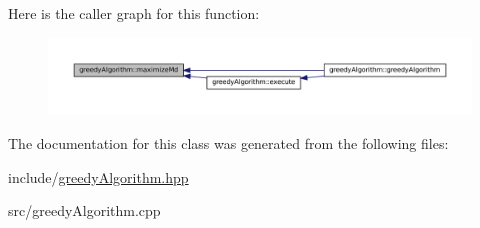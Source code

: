 Here is the caller graph for this function\+:
\nopagebreak
\begin{figure}[H]
\begin{center}
\leavevmode
\includegraphics[width=350pt]{classgreedyAlgorithm_a4968e1371d2fdfb1b1b6f24b57dd1f07_icgraph}
\end{center}
\end{figure}


The documentation for this class was generated from the following files\+:\begin{DoxyCompactItemize}
\item 
include/\hyperlink{greedyAlgorithm_8hpp}{greedy\+Algorithm.\+hpp}\item 
src/greedy\+Algorithm.\+cpp\end{DoxyCompactItemize}
